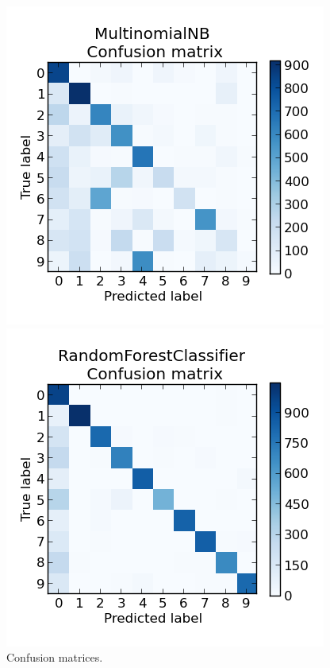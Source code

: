 \documentclass{scrartcl}
\begin{document}
\begin{figure}[H]
\begin{minipage}{.5\textwidth}
  \centering
  \includegraphics[width=.8\linewidth]{img/MultinomialNB.png}
\end{minipage}%
\begin{minipage}{.5\textwidth}
  \centering
  \includegraphics[width=.8\linewidth]{img/RandomForestClassifier.png}
\end{minipage}
\caption{Confusion matrices.}
\label{fig:confusion}
\end{figure}
\end{document}
